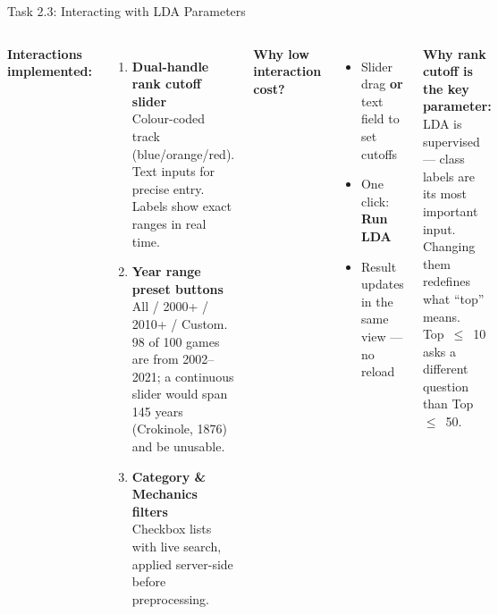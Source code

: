\documentclass[aspectratio=169, 11pt]{beamer}
\begin{document}
\begin{frame}[t]{Task 2.3: Interacting with LDA Parameters}

\begin{columns}[T]
  \textbf{Interactions implemented:}
  \begin{enumerate}\setlength\itemsep{6pt}
    \item \textbf{Dual-handle rank cutoff slider}\\
          Colour-coded track (blue/orange/red). Text inputs for precise entry. Labels show exact ranges in real time.

    \item \textbf{Year range preset buttons}\\
          All / 2000+ / 2010+ / Custom.\\
          98 of 100 games are from 2002--2021; a continuous slider would span 145 years (Crokinole, 1876) and be unusable.

    \item \textbf{Category \& Mechanics filters}\\
          Checkbox lists with live search, applied server-side before preprocessing.
  \end{enumerate}

  \textbf{Why low interaction cost?}
  \begin{itemize}\setlength\itemsep{4pt}
    \item Slider drag \textbf{or} text field to set cutoffs
    \item One click: \textbf{Run LDA}
    \item Result updates in the same view — no reload
  \end{itemize}

  \vspace{6pt}
  \textbf{Why rank cutoff is the key parameter:}\\
  \small LDA is supervised — class labels are its most important input. Changing them redefines what ``top'' means. Top~$\le$~10 asks a different question than Top~$\le$~50.
\end{columns}

\end{frame}
\end{document}
